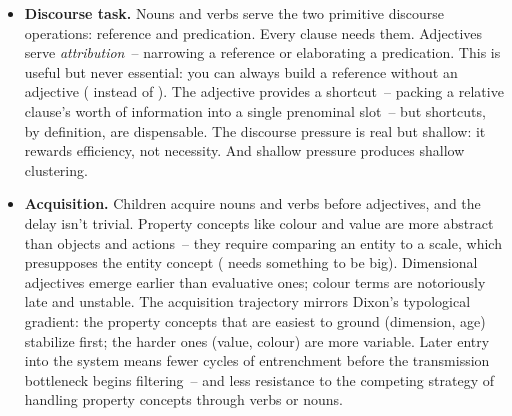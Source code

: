 \begin{itemize}
    \item \textbf{Discourse task.} Nouns and verbs serve the two primitive discourse operations: reference and predication. Every clause needs them. Adjectives serve \emph{attribution}~-- narrowing a reference or elaborating a predication. This is useful but never essential: you can always build a reference without an adjective ( instead of ). The adjective provides a shortcut~-- packing a relative clause's worth of information into a single prenominal slot~-- but shortcuts, by definition, are dispensable. The discourse pressure is real but shallow: it rewards efficiency, not necessity. And shallow pressure produces shallow clustering.
    \item \textbf{Acquisition.} Children acquire nouns and verbs before adjectives, and the delay isn't trivial. Property concepts like colour and value are more abstract than objects and actions~-- they require comparing an entity to a scale, which presupposes the entity concept ( needs something to be big). Dimensional adjectives emerge earlier than evaluative ones; colour terms are notoriously late and unstable. The acquisition trajectory mirrors Dixon's typological gradient: the property concepts that are easiest to ground (dimension, age) stabilize first; the harder ones (value, colour) are more variable. Later entry into the system means fewer cycles of entrenchment before the transmission bottleneck begins filtering~-- and less resistance to the competing strategy of handling property concepts through verbs or nouns.

\end{itemize}

